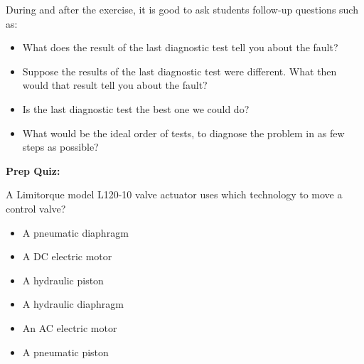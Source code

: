 During and after the exercise, it is good to ask students follow-up questions such as:

\begin{itemize}
\item{} What does the result of the last diagnostic test tell you about the fault?
\item{} Suppose the results of the last diagnostic test were different.  What then would that result tell you about the fault?
\item{} Is the last diagnostic test the best one we could do?
\item{} What would be the ideal order of tests, to diagnose the problem in as few steps as possible?
\end{itemize}














\vfil \eject

\noindent
{\bf Prep Quiz:}

A Limitorque model L120-10 valve actuator uses which technology to move a control valve?

\begin{itemize}
\item{} A pneumatic diaphragm
\vskip 5pt 
\item{} A DC electric motor
\vskip 5pt 
\item{} A hydraulic piston
\vskip 5pt 
\item{} A hydraulic diaphragm
\vskip 5pt 
\item{} An AC electric motor
\vskip 5pt 
\item{} A pneumatic piston
\end{itemize}





